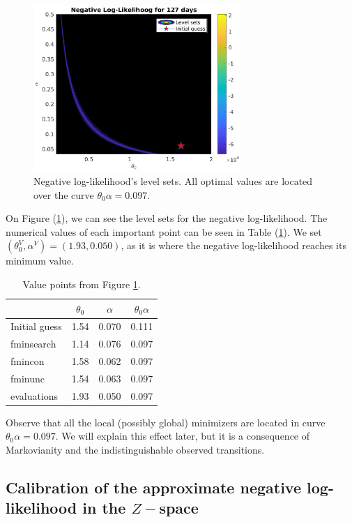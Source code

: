 \documentclass[11pt]{article}
\theoremstyle{definition}
\begin{document}
\begin{figure}[H]
\centering
\includegraphics[width=0.7\textwidth]{../../MATLAB_Files/Results/likelihood/normal/Log-Likelihood.eps}
\caption{Negative log-likelihood's level sets. All optimal values are located over the curve $\theta_0\alpha=0.097$.}
\label{fig:neg-LL}
\end{figure}
On Figure (\ref{fig:neg-LL}), we can see the level sets for the negative log-likelihood. The numerical values of each important point can be seen in Table (\ref{tab:optimal_values}). We set $(\theta_0^V,\alpha^V)=(1.93,0.050)$, as it is where the negative log-likelihood reaches its minimum value.
\begin{table}[H]
\centering
\begin{tabular}{lccc}
\toprule
 & $\theta_0$ & $\alpha$ & $\theta_0\alpha$\\
 \midrule
 Initial guess & 1.54 & 0.070 & 0.111 \\
 fminsearch & 1.14 & 0.076 & 0.097 \\
 fmincon & 1.58 & 0.062 & 0.097 \\
 fminunc & 1.54 & 0.063 & 0.097 \\
 evaluations & 1.93 & 0.050 & 0.097 \\
 \bottomrule
\end{tabular}
\caption{Value points from Figure \ref{fig:neg-LL}.}
\label{tab:optimal_values}
\end{table}
Observe that all the local (possibly global) minimizers are located in curve $\theta_0\alpha=0.097$. We will explain this effect later, but it is a consequence of Markovianity and the indistinguishable observed transitions.

\subsection{Calibration of the approximate negative log-likelihood in the $Z-$space}
\end{document}
